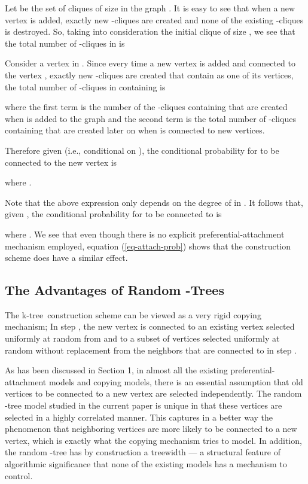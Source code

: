 \documentclass[11pt]{article}
\providecommand{\ktree}{k-tree}
\begin{document}
Let  be the set of cliques of size  in the graph .
It is easy to see that when a new vertex is added, exactly  new -cliques are created and none of the existing -cliques is destroyed.
So, taking into consideration the initial clique of size , we see that the total number of -cliques in
 is


Consider a vertex  in . 
Since every time a new vertex is added and connected to the vertex , 
exactly   new -cliques are created
that contain  as one of its vertices, the total number of -cliques in  containing  is

where the first term is the number of the -cliques containing  that are created when  is added to the graph and the second term is the total number of -cliques 
containing  that are created later on when  is connected to new vertices. 

Therefore given  (i.e., conditional on ),  the conditional
probability for  to be connected to the new vertex  is

where . 

Note that the above expression only depends on the degree of  in . 
It follows that, given ,
the conditional probability for  to be connected to  is

where .
We see that even though there is no explicit preferential-attachment mechanism employed, equation (\ref{eq-attach-prob}) shows that the construction scheme does have a similar effect.

\subsection{The Advantages of Random -Trees}
The \ktree\ construction scheme can be viewed as a very rigid copying mechanism; In step , the new vertex 
is connected to an existing vertex  selected uniformly at random from  and to a subset of  vertices selected uniformly at random
without replacement from the  neighbors that are connected to  in step .

As has been discussed in Section 1, in almost all the existing  preferential-attachment models
and copying models, there is an essential assumption that old vertices to be connected to 
a new vertex are selected independently. The random -tree model studied in the current paper
is unique in that  these vertices are selected in a highly correlated manner. This
captures in a better way the phenomenon that neighboring vertices are more likely to be 
connected to a new vertex, which is exactly what the copying mechanism tries to model.  
In addition, the random -tree has by construction a treewidth  --- a structural
feature of algorithmic significance that none of the existing models  
has a mechanism to control.  
       
\end{document}
